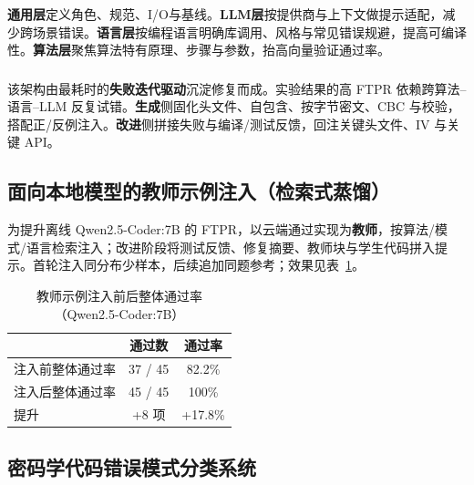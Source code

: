 \documentclass[runningheads]{llncs}
\begin{document}
\subsubsection{}
    \item \textbf{通用层}定义角色、规范、I/O与基线。\textbf{LLM层}按提供商与上下文做提示适配，减少跨场景错误。\textbf{语言层}按编程语言明确库调用、风格与常见错误规避，提高可编译性。\textbf{算法层}聚焦算法特有原理、步骤与参数，抬高向量验证通过率。
\subsubsection{}
    \item 该架构由最耗时的\textbf{失败迭代驱动}沉淀修复而成。实验结果的高 FTPR 依赖跨算法–语言–LLM 反复试错。\textbf{生成}侧固化头文件、自包含、按字节密文、CBC 与校验，搭配正/反例注入。\textbf{改进}侧拼接失败与编译/测试反馈，回注关键头文件、IV 与关键 API。

\subsection{面向本地模型的教师示例注入（检索式蒸馏）}
\label{subsec:distillation}
为提升离线 Qwen2.5-Coder:7B 的 FTPR，以云端通过实现为\textbf{教师}，按算法/模式/语言检索注入；改进阶段将测试反馈、修复摘要、教师块与学生代码拼入提示。首轮注入同分布少样本，后续追加同题参考；效果见表~\ref{tab:distillation_overall}。
\begin{table}[H]
  \centering
  \footnotesize
  \caption{教师示例注入前后整体通过率（Qwen2.5-Coder:7B）}
  \label{tab:distillation_overall}
  \begin{tabular}{l c c}
    \toprule
    & 通过数 & 通过率 \\
    \midrule
    注入前整体通过率 & 37 / 45 & 82.2\% \\
    注入后整体通过率 & 45 / 45 & 100\% \\
    提升             & +8 项   & +17.8\% \\
    \bottomrule
  \end{tabular}
\end{table}

\subsection{密码学代码错误模式分类系统}
\end{document}
